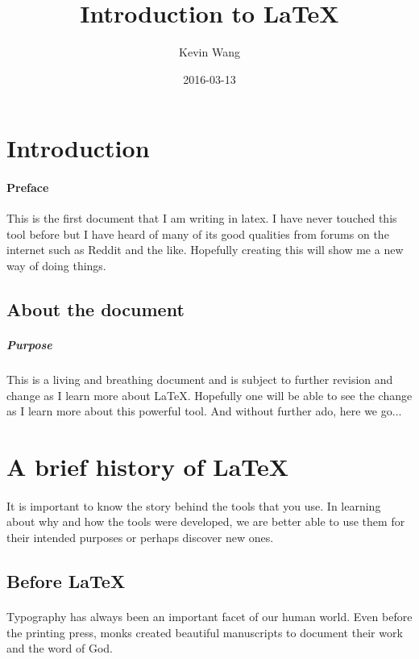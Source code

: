 \documentclass{article}
\title{Introduction to LaTeX}
\date{2016-03-13}
\author{Kevin Wang}
\begin{document}
\maketitle
\newpage
{}

\section{Introduction}

\paragraph{Preface}
This is the first document that I am writing in latex. I have never touched this tool before but I have heard of many of its good qualities from forums on the internet such as Reddit and the like. Hopefully creating this will show me a new way of doing things.

\subsection{About the document}
\subparagraph{Purpose}
This is a living and breathing document and is subject to further revision and change as I learn more about LaTeX. Hopefully one will be able to see the change as I learn more about this powerful tool.
And without further ado, here we go...

\newpage
{}
\section{A brief history of LaTeX}

\paragraph{}
It is important to know the story behind the tools that you use. In learning about why and how the tools were developed, we are better able to use them for their intended purposes or perhaps discover new ones.

\subsection{Before LaTeX}
\paragraph{}
Typography has always been an important facet of our human world. Even before the printing press, monks created beautiful manuscripts to document their work and the word of God.
\end{document}
